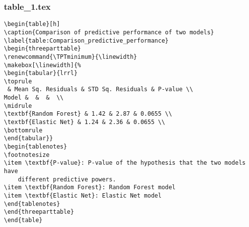 \documentclass[11pt]{article}
\begin{document}
\subsubsection*{table\_1.tex}

\begin{Verbatim}[tabsize=4]
\begin{table}[h]
\caption{Comparison of predictive performance of two models}
\label{table:Comparison_predictive_performance}
\begin{threeparttable}
\renewcommand{\TPTminimum}{\linewidth}
\makebox[\linewidth]{%
\begin{tabular}{lrrl}
\toprule
 & Mean Sq. Residuals & STD Sq. Residuals & P-value \\
Model &  &  &  \\
\midrule
\textbf{Random Forest} & 1.42 & 2.87 & 0.0655 \\
\textbf{Elastic Net} & 1.24 & 2.36 & 0.0655 \\
\bottomrule
\end{tabular}}
\begin{tablenotes}
\footnotesize
\item \textbf{P-value}: P-value of the hypothesis that the two models have
	different predictive powers.
\item \textbf{Random Forest}: Random Forest model
\item \textbf{Elastic Net}: Elastic Net model
\end{tablenotes}
\end{threeparttable}
\end{table}

\end{Verbatim}
\end{document}
